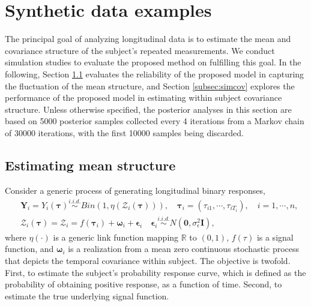 \section{Synthetic data examples}
\label{sec:simstudy}

The principal goal of analyzing longitudinal data is to estimate the mean and covariance structure of the subject's repeated measurements. We conduct simulation studies to evaluate the proposed method on fulfilling this goal. In the following, Section \ref{subsec:simmean} evaluates the
reliability of the proposed model in capturing the fluctuation of the mean structure, and Section \ref{subsec:simcov} explores the performance of the proposed model in estimating within subject covariance structure. 
Unless otherwise specified, the posterior analyses in this section are based on 5000 posterior samples collected every 4 iterations from a Markov chain of 30000 iterations, with the first 10000 samples being discarded. 

 
\subsection{Estimating mean structure}
\label{subsec:simmean}

Consider a generic process of generating longitudinal binary responses,
\begin{equation}
\begin{split}
    &\mathbf{Y}_i=Y_i(\boldsymbol{\tau})\stackrel{i.i.d.}{\sim} Bin(1,\eta(\mathcal{Z}_i(\boldsymbol{\tau}))),\quad \boldsymbol{\tau}_i=(\tau_{i1},\cdots,\tau_{iT_i}),\quad i=1,\cdots,n,\\
    & \mathcal{Z}_i(\boldsymbol{\tau})=\boldsymbol{\mathcal{Z}}_i=f(\boldsymbol{\tau}_i)+\boldsymbol{\omega}_i+\boldsymbol{\epsilon}_i\quad \boldsymbol{\epsilon}_i\stackrel{i.i.d.}{\sim} N(\mathbf{0},\sigma_{\epsilon}^2\mathbf{I}),
    \end{split}    
    \label{eq:datagensim}
\end{equation}
where $\eta(\cdot)$ is a generic link function mapping $\mathbb{R}$ to $(0,1)$, $f(\tau)$ is a signal function, and 
$\boldsymbol{\omega}_i$ is a realization from a mean zero continuous stochastic process that depicts the temporal covariance within subject. The objective is twofold. First, to estimate the subject's probability response curve, which is defined as the probability of obtaining positive response, as a function of time. Second, to estimate the true underlying signal function. 

